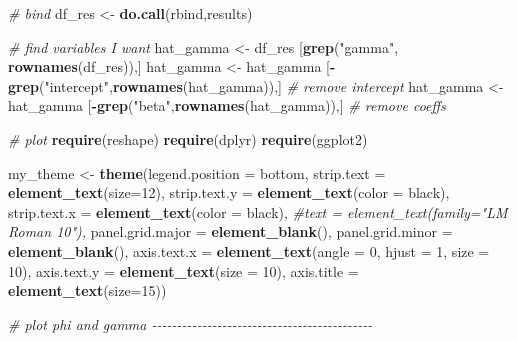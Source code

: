 \documentclass[
]{article}
\newenvironment{Shaded}{\begin{snugshade}}{\end{snugshade}}
\newcommand{\AttributeTok}[1]{\textcolor[rgb]{0.13,0.29,0.53}{#1}}
\newcommand{\CommentTok}[1]{\textcolor[rgb]{0.56,0.35,0.01}{\textit{#1}}}
\newcommand{\DecValTok}[1]{\textcolor[rgb]{0.00,0.00,0.81}{#1}}
\newcommand{\FunctionTok}[1]{\textcolor[rgb]{0.13,0.29,0.53}{\textbf{#1}}}
\newcommand{\NormalTok}[1]{#1}
\newcommand{\OtherTok}[1]{\textcolor[rgb]{0.56,0.35,0.01}{#1}}
\newcommand{\SpecialCharTok}[1]{\textcolor[rgb]{0.81,0.36,0.00}{\textbf{#1}}}
\newcommand{\StringTok}[1]{\textcolor[rgb]{0.31,0.60,0.02}{#1}}
\begin{document}
{\begin{Shaded}
\begin{Highlighting}[]
\CommentTok{\# bind}
\NormalTok{df\_res }\OtherTok{\textless{}{-}} \FunctionTok{do.call}\NormalTok{(rbind,results)}

\CommentTok{\# find variables I want}
\NormalTok{hat\_gamma }\OtherTok{\textless{}{-}}\NormalTok{ df\_res [}\FunctionTok{grep}\NormalTok{(}\StringTok{"gamma"}\NormalTok{, }\FunctionTok{rownames}\NormalTok{(df\_res)),]}
\NormalTok{hat\_gamma }\OtherTok{\textless{}{-}}\NormalTok{ hat\_gamma [}\SpecialCharTok{{-}}\FunctionTok{grep}\NormalTok{(}\StringTok{"intercept"}\NormalTok{,}\FunctionTok{rownames}\NormalTok{(hat\_gamma)),] }\CommentTok{\# remove intercept}
\NormalTok{hat\_gamma }\OtherTok{\textless{}{-}}\NormalTok{ hat\_gamma [}\SpecialCharTok{{-}}\FunctionTok{grep}\NormalTok{(}\StringTok{"beta"}\NormalTok{,}\FunctionTok{rownames}\NormalTok{(hat\_gamma)),] }\CommentTok{\# remove coeffs}

\CommentTok{\# plot}
\FunctionTok{require}\NormalTok{(reshape)}
\FunctionTok{require}\NormalTok{(dplyr)}
\FunctionTok{require}\NormalTok{(ggplot2)}

\NormalTok{my\_theme }\OtherTok{\textless{}{-}} \FunctionTok{theme}\NormalTok{(}\AttributeTok{legend.position =} \StringTok{\textquotesingle{}bottom\textquotesingle{}}\NormalTok{, }
                  \AttributeTok{strip.text =} \FunctionTok{element\_text}\NormalTok{(}\AttributeTok{size=}\DecValTok{12}\NormalTok{),}
                  \AttributeTok{strip.text.y =} \FunctionTok{element\_text}\NormalTok{(}\AttributeTok{color =} \StringTok{\textquotesingle{}black\textquotesingle{}}\NormalTok{),}
                  \AttributeTok{strip.text.x =} \FunctionTok{element\_text}\NormalTok{(}\AttributeTok{color =} \StringTok{\textquotesingle{}black\textquotesingle{}}\NormalTok{), }
                  \CommentTok{\#text = element\_text(family="LM Roman 10"),}
                  \AttributeTok{panel.grid.major =} \FunctionTok{element\_blank}\NormalTok{(),}
                  \AttributeTok{panel.grid.minor =} \FunctionTok{element\_blank}\NormalTok{(),}
                  \AttributeTok{axis.text.x =} \FunctionTok{element\_text}\NormalTok{(}\AttributeTok{angle =} \DecValTok{0}\NormalTok{, }\AttributeTok{hjust =} \DecValTok{1}\NormalTok{, }\AttributeTok{size =} \DecValTok{10}\NormalTok{), }
                  \AttributeTok{axis.text.y =} \FunctionTok{element\_text}\NormalTok{(}\AttributeTok{size =} \DecValTok{10}\NormalTok{),}
                  \AttributeTok{axis.title =} \FunctionTok{element\_text}\NormalTok{(}\AttributeTok{size=}\DecValTok{15}\NormalTok{))}

\CommentTok{\# plot phi and gamma {-}{-}{-}{-}{-}{-}{-}{-}{-}{-}{-}{-}{-}{-}{-}{-}{-}{-}{-}{-}{-}{-}{-}{-}{-}{-}{-}{-}{-}{-}{-}{-}{-}{-}{-}{-}{-}{-}{-}{-}{-}{-}{-}{-}}


\end{Highlighting}
\end{Shaded}}
\end{document}
